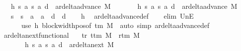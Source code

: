 \begin{isabellebody}
\ \ \ h{}{\isacharcolon}{\kern0pt}\ {\isachardoublequoteopen}{\isacharparenleft}{\kern0pt}s{\isacharcomma}{\kern0pt}\ a{\isacharcomma}{\kern0pt}\ s{}{\isacharcomma}{\kern0pt}\ a{}{\isacharcomma}{\kern0pt}\ d{}{\isacharparenright}{\kern0pt}\ {\isasymin}\ ar{\isacharunderscore}{\kern0pt}delta{\isacharunderscore}{\kern0pt}advance\ M{\isachardoublequoteclose}\isanewline
\ \ \ \ \ \ \ h{}{\isacharcolon}{\kern0pt}\ {\isachardoublequoteopen}{\isacharparenleft}{\kern0pt}s{\isacharcomma}{\kern0pt}\ a{\isacharcomma}{\kern0pt}\ s{}{\isacharcomma}{\kern0pt}\ a{}{\isacharcomma}{\kern0pt}\ d{}{\isacharparenright}{\kern0pt}\ {\isasymin}\ ar{\isacharunderscore}{\kern0pt}delta{\isacharunderscore}{\kern0pt}advance\ M{\isachardoublequoteclose}\isanewline
\ \ \ {\isachardoublequoteopen}s{}\ {\isacharequal}{\kern0pt}\ s{}\ {\isasymand}\ a{}\ {\isacharequal}{\kern0pt}\ a{}\ {\isasymand}\ d{}\ {\isacharequal}{\kern0pt}\ d{}{\isachardoublequoteclose}\isanewline
%
\isadelimproof
\ \ %
\endisadelimproof
%
\isatagproof
{}\isamarkupfalse%
\ h{}\ \isamarkupfalse%
\ ar{\isacharunderscore}{\kern0pt}delta{\isacharunderscore}{\kern0pt}advance{\isacharunderscore}{\kern0pt}def\isanewline
\ \ \isamarkupfalse%
\ {\isacharparenleft}{\kern0pt}elim\ UnE{\isacharsemicolon}{\kern0pt}\isanewline
\ \ \ \ \ \ use\ h{}\ block{\isacharunderscore}{\kern0pt}width{\isacharunderscore}{\kern0pt}pos{\isacharbrackleft}{\kern0pt}of\ {\isachardoublequoteopen}{\isasymGamma}{\isacharunderscore}{\kern0pt}tm\ M{\isachardoublequoteclose}{\isacharbrackright}{\kern0pt}\ \ {\isacartoucheopen}auto\ simp{\isacharcolon}{\kern0pt}\ ar{\isacharunderscore}{\kern0pt}delta{\isacharunderscore}{\kern0pt}advance{\isacharunderscore}{\kern0pt}def{\isacartoucheclose}{\isacharparenright}{\kern0pt}%
\endisatagproof
{\isafoldproof}%
%
\isadelimproof
\isanewline
%
\endisadelimproof
\isanewline
{}\isamarkupfalse%
\ ar{\isacharunderscore}{\kern0pt}delta{\isacharunderscore}{\kern0pt}next{\isacharunderscore}{\kern0pt}functional{\isacharcolon}{\kern0pt}\isanewline
\ \ \ tr{\isacharcolon}{\kern0pt}\ {\isachardoublequoteopen}t{\isacharunderscore}{\kern0pt}tm\ M\ {\isasymnoteq}\ r{\isacharunderscore}{\kern0pt}tm\ M{\isachardoublequoteclose}\isanewline
\ \ \ \ \ \ \ h{}{\isacharcolon}{\kern0pt}\ {\isachardoublequoteopen}{\isacharparenleft}{\kern0pt}s{\isacharcomma}{\kern0pt}\ a{\isacharcomma}{\kern0pt}\ s{}{\isacharcomma}{\kern0pt}\ a{}{\isacharcomma}{\kern0pt}\ d{}{\isacharparenright}{\kern0pt}\ {\isasymin}\ ar{\isacharunderscore}{\kern0pt}delta{\isacharunderscore}{\kern0pt}next\ M{\isachardoublequoteclose}\isanewline

\end{isabellebody}
